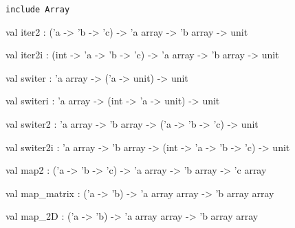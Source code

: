 \documentclass[11pt]{article}
\begin{document}
\begin{ocamldocsigend}


{\tt{include }}{\tt{Array}}

\label{val:Util.A.iter2}\begin{ocamldoccode}
val iter2 : ('a -> 'b -> 'c) -> 'a array -> 'b array -> unit
\end{ocamldoccode}


\label{val:Util.A.iter2i}\begin{ocamldoccode}
val iter2i : (int -> 'a -> 'b -> 'c) -> 'a array -> 'b array -> unit
\end{ocamldoccode}


\label{val:Util.A.switer}\begin{ocamldoccode}
val switer : 'a array -> ('a -> unit) -> unit
\end{ocamldoccode}


\label{val:Util.A.switeri}\begin{ocamldoccode}
val switeri : 'a array -> (int -> 'a -> unit) -> unit
\end{ocamldoccode}


\label{val:Util.A.switer2}\begin{ocamldoccode}
val switer2 : 'a array -> 'b array -> ('a -> 'b -> 'c) -> unit
\end{ocamldoccode}


\label{val:Util.A.switer2i}\begin{ocamldoccode}
val switer2i : 'a array -> 'b array -> (int -> 'a -> 'b -> 'c) -> unit
\end{ocamldoccode}


\label{val:Util.A.map2}\begin{ocamldoccode}
val map2 : ('a -> 'b -> 'c) -> 'a array -> 'b array -> 'c array
\end{ocamldoccode}


\label{val:Util.A.map-underscorematrix}\begin{ocamldoccode}
val map_matrix : ('a -> 'b) -> 'a array array -> 'b array array
\end{ocamldoccode}


\label{val:Util.A.map-underscore2D}\begin{ocamldoccode}
val map_2D : ('a -> 'b) -> 'a array array -> 'b array array
\end{ocamldoccode}



\end{ocamldocsigend}
\end{document}
